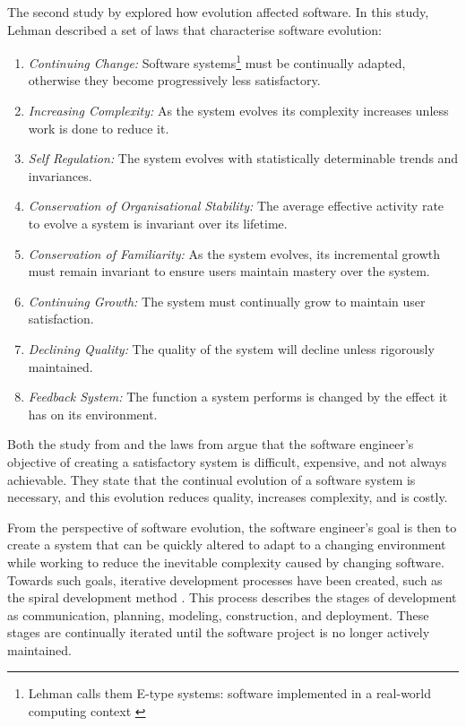 The second study by \cite{lehman1980} explored how evolution affected software.
In this study, Lehman described a set of laws that characterise software evolution:
\begin{enumerate}
  \item \textit{Continuing Change:} Software systems\footnote{Lehman calls them E-type systems: software implemented in a real-world computing context \citep{lehman1980}} must be continually adapted, 
  otherwise they become progressively less satisfactory.
  \item \textit{Increasing Complexity:} As the system evolves its complexity increases unless work is done to reduce it.
  \item \textit{Self Regulation:} The system evolves with statistically determinable trends and invariances.
  \item \textit{Conservation of Organisational Stability:} The average effective activity rate to evolve a system is invariant over its lifetime.
  \item \textit{Conservation of Familiarity:} As the system evolves, its incremental growth must remain invariant to ensure users maintain mastery over the system.
  \item \textit{Continuing Growth:} The system must continually grow to maintain user satisfaction.
  \item \textit{Declining Quality:} The quality of the system will decline unless rigorously maintained.
  \item \textit{Feedback System:} The function a system performs is changed by the effect it has on its environment.
\end{enumerate}

Both the study from \cite{Lientz1980} and the laws from \citep{lehman1980} argue that
the software engineer's objective of creating a satisfactory system is difficult, expensive, and not always achievable.
They state that the continual evolution of a software system is necessary, and this evolution reduces quality, increases complexity, and is costly.

From the perspective of software evolution, the software engineer's goal is then to create a system that can be quickly altered to adapt to a changing environment 
while working to reduce the inevitable complexity caused by changing software.
Towards such goals, iterative development processes have been created, such as the spiral development method \citep{Boehm1988}.
This process describes the stages of development as communication, planning, modeling, construction, and deployment. 
These stages are continually iterated until the software project is no longer actively maintained. 

